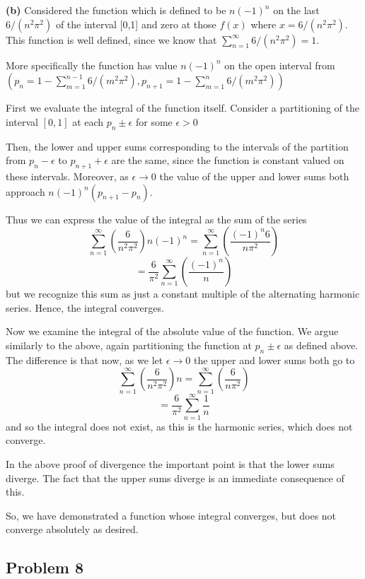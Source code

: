 \documentclass[12pt]{article}
\begin{document}
\textbf{(b)} Considered the function which is defined to be $n (-1)^n$ on the last $6/(n^2\pi^2)$ of the interval [0,1] and zero at those $f(x)$ where $x=6/(n^2\pi^2)$. This function is well defined, since we know that $\sum_{n=1}^\infty 6/(n^2\pi^2) = 1 $. 

More specifically the function has value $n(-1)^n$ on the open interval from $(p_n=1-\sum_{m=1}^{n-1} 6/(m^2\pi^2),p_{n+1}=1-\sum_{m=1}^n 6/(m^2\pi^2))$

First we evaluate the integral of the function itself. Consider a partitioning of the interval $[0,1]$ at each $p_n \pm \epsilon$ for some $\epsilon >0$

Then, the lower and upper sums corresponding to the intervals of the partition from $p_n - \epsilon$ to $p_{n+1} + \epsilon$ are the same, since the function is constant valued on these intervals. Moreover, as $\epsilon \to 0$ the value of the upper and lower sums both approach $n (-1)^n(p_{n+1}-p_n)$.

Thus we can express the value of the integral as the sum of the series
\[\sum_{n=1}^\infty \left( \frac{6}{n^2\pi^2}\right)n (-1)^n = \sum_{n=1}^\infty \left( \frac{(-1)^n 6}{n\pi^2}\right)  \]
\[ =\frac{6}{\pi^2} \sum_{n=1}^\infty \left( \frac{(-1)^n }{n}\right)  \]
but we recognize this sum as just a constant multiple of the alternating harmonic series. Hence, the integral converges.

Now we examine the integral of the absolute value of the function. We argue similarly to the above, again partitioning the function at $p_n\pm \epsilon$ as defined above. The difference is that now, as we let $\epsilon \to 0$ the upper and lower sums both go to 
\[\sum_{n=1}^\infty \left( \frac{6}{n^2\pi^2}\right)n  = \sum_{n=1}^\infty \left( \frac{ 6}{n\pi^2}\right)  \]
\[  = \frac{6}{\pi^2} \sum_{n=1}^\infty  \frac{ 1}{n} \]
and so the integral does not exist, as this is the harmonic series, which does not converge.

In the above proof of divergence the important point is that the lower sums diverge. The fact that the upper sums diverge is an immediate consequence of this.

So, we have demonstrated a function whose integral converges, but does not converge absolutely as desired.

\subsection{Problem 8}
\end{document}
